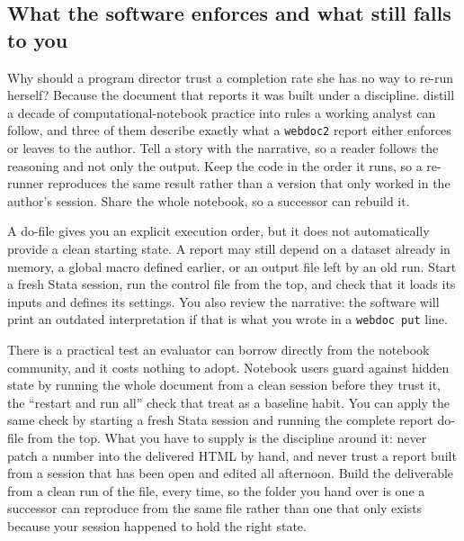 \documentclass[
    a4paper,
    fontsize=10pt,
    twoside=true,
    numbers=noenddot,
]{kaobook}
\begin{document}
\subsection{What the software enforces and what still falls to you}
Why should a program director trust a completion rate she has no way to re-run herself? Because the document that reports it was built under a discipline. \textcite{rule2019ten} distill a decade of computational-notebook practice into rules a working analyst can follow, and three of them describe exactly what a \texttt{webdoc2} report either enforces or leaves to the author. Tell a story with the narrative, so a reader follows the reasoning and not only the output. Keep the code in the order it runs, so a re-runner reproduces the same result rather than a version that only worked in the author's session. Share the whole notebook, so a successor can rebuild it.

A do-file gives you an explicit execution order, but it does not automatically provide a clean starting state. A report may still depend on a dataset already in memory, a global macro defined earlier, or an output file left by an old run. Start a fresh Stata session, run the control file from the top, and check that it loads its inputs and defines its settings. You also review the narrative: the software will print an outdated interpretation if that is what you wrote in a \texttt{webdoc put} line.

There is a practical test an evaluator can borrow directly from the notebook community, and it costs nothing to adopt. Notebook users guard against hidden state by running the whole document from a clean session before they trust it, the \enquote{restart and run all} check that \textcite{rule2019ten} treat as a baseline habit. You can apply the same check by starting a fresh Stata session and running the complete report do-file from the top. What you have to supply is the discipline around it: never patch a number into the delivered HTML by hand, and never trust a report built from a session that has been open and edited all afternoon. Build the deliverable from a clean run of the file, every time, so the folder you hand over is one a successor can reproduce from the same file rather than one that only exists because your session happened to hold the right state.
\end{document}
